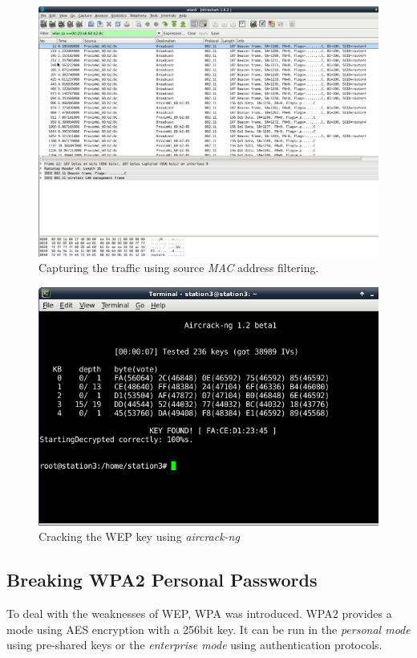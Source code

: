 \documentclass[12pt,a4paper]{article}
\begin{document}
	
	\begin{figure}
		\includegraphics[width=\textwidth]{images/bill/pic1.png}
		\caption{Capturing the traffic using source \emph{MAC} address filtering.}
		\label{wep:wireshark}
	\end{figure}
	\begin{figure}
		\includegraphics[width=\textwidth]{images/bill/pic3.png}
		\caption{Cracking the WEP key using \emph{aircrack-ng}}
		\label{wep:airodump}
	\end{figure}
	
	\subsection{Breaking WPA2 Personal Passwords}
	To deal with the weaknesses of WEP, WPA was introduced. WPA2 provides a mode using AES encryption with a 256bit key. It can be run in the \emph{personal mode} using pre-shared keys or the \emph{enterprise mode} using authentication protocols.
	
\end{document}
